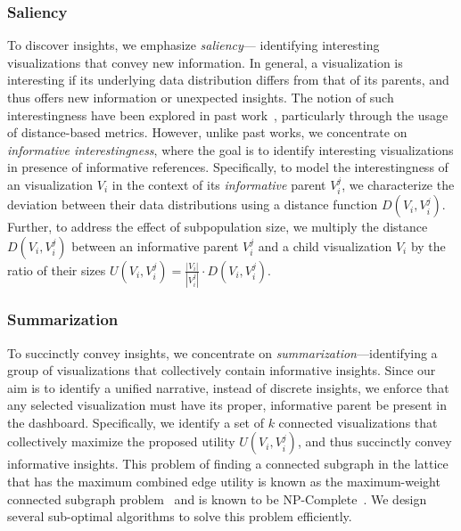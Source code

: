 \subsubsection{Saliency}
To discover insights, we emphasize \emph{saliency}--- identifying interesting visualizations that convey new information. In general, a visualization is interesting if its underlying data distribution differs from that of its parents, and thus offers new information or unexpected insights. The notion of such interestingness have been explored in past work~\cite{Vartak2015,Correll2016,Itti2009}, particularly through the usage of distance-based metrics. However, unlike past works, we concentrate on \emph{informative interestingness}, where the goal is to identify interesting visualizations in presence of informative references. Specifically, to model the interestingness of an visualization $V_i$ in the context of its \emph{informative} parent $V_i^j$, we characterize the deviation between their data distributions using a distance function $D(V_i, V_i^j)$. Further, to address the effect of subpopulation size, we multiply the distance $D(V_i, V_i^j)$ between an informative parent $V_i^j$ and a child visualization $V_i$ by the ratio of their sizes  $U(V_i, V_i^j) = \frac{|V_i|}{|V_i^{j}|} \cdot D(V_i, V_i^j)$.

\subsubsection{Summarization}
To succinctly convey insights, we concentrate on \emph{summarization}---identifying a group of visualizations that collectively contain informative insights. Since our aim is to identify a unified narrative, instead of discrete insights, we enforce that any selected visualization must have its proper, informative parent be present in the dashboard. Specifically, we identify a set of $k$ connected visualizations that collectively maximize the proposed utility $U(V_i, V_i^j)$, and thus succinctly convey informative insights. This problem of finding a connected subgraph in the lattice that has the maximum combined edge utility is known as the maximum-weight connected subgraph problem~\cite{ErnstAlthaus2009} and is known to be NP-Complete~\cite{Parameswaran2010}. We design several sub-optimal algorithms to solve this problem efficiently. 


